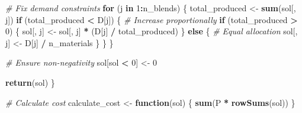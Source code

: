 \documentclass[
]{article}
\newenvironment{Shaded}{\begin{snugshade}}{\end{snugshade}}
\newcommand{\CommentTok}[1]{\textcolor[rgb]{0.56,0.35,0.01}{\textit{#1}}}
\newcommand{\ControlFlowTok}[1]{\textcolor[rgb]{0.13,0.29,0.53}{\textbf{#1}}}
\newcommand{\DecValTok}[1]{\textcolor[rgb]{0.00,0.00,0.81}{#1}}
\newcommand{\FunctionTok}[1]{\textcolor[rgb]{0.13,0.29,0.53}{\textbf{#1}}}
\newcommand{\NormalTok}[1]{#1}
\newcommand{\OtherTok}[1]{\textcolor[rgb]{0.56,0.35,0.01}{#1}}
\newcommand{\SpecialCharTok}[1]{\textcolor[rgb]{0.81,0.36,0.00}{\textbf{#1}}}
\begin{document}
\begin{Shaded}
\begin{Highlighting}[]
    \CommentTok{\# Fix demand constraints}
    \ControlFlowTok{for}\NormalTok{ (j }\ControlFlowTok{in} \DecValTok{1}\SpecialCharTok{:}\NormalTok{n\_blends) \{}
\NormalTok{      total\_produced }\OtherTok{\textless{}{-}} \FunctionTok{sum}\NormalTok{(sol[, j])}
      \ControlFlowTok{if}\NormalTok{ (total\_produced }\SpecialCharTok{\textless{}}\NormalTok{ D[j]) \{}
        \CommentTok{\# Increase proportionally}
        \ControlFlowTok{if}\NormalTok{ (total\_produced }\SpecialCharTok{\textgreater{}} \DecValTok{0}\NormalTok{) \{}
\NormalTok{          sol[, j] }\OtherTok{\textless{}{-}}\NormalTok{ sol[, j] }\SpecialCharTok{*}\NormalTok{ (D[j] }\SpecialCharTok{/}\NormalTok{ total\_produced)}
\NormalTok{        \} }\ControlFlowTok{else}\NormalTok{ \{}
          \CommentTok{\# Equal allocation}
\NormalTok{          sol[, j] }\OtherTok{\textless{}{-}}\NormalTok{ D[j] }\SpecialCharTok{/}\NormalTok{ n\_materials}
\NormalTok{        \}}
\NormalTok{      \}}
\NormalTok{    \}}
    
    \CommentTok{\# Ensure non{-}negativity}
\NormalTok{    sol[sol }\SpecialCharTok{\textless{}} \DecValTok{0}\NormalTok{] }\OtherTok{\textless{}{-}} \DecValTok{0}
    
    \FunctionTok{return}\NormalTok{(sol)}
\NormalTok{  \}}
  
  \CommentTok{\# Calculate cost}
\NormalTok{  calculate\_cost }\OtherTok{\textless{}{-}} \ControlFlowTok{function}\NormalTok{(sol) \{}
    \FunctionTok{sum}\NormalTok{(P }\SpecialCharTok{*} \FunctionTok{rowSums}\NormalTok{(sol))}
\NormalTok{  \}}
  

\end{Highlighting}
\end{Shaded}
\end{document}
